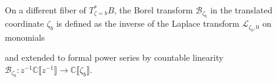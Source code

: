 \documentclass{article}
\newcommand{\maps}{\colon}
\newcommand{\C}{\mathbb{C}}
\newcommand{\laplace}{\mathcal{L}}
\newcommand{\borel}{\mathcal{B}}
\theoremstyle{definition}
\theoremstyle{plain}
\begin{document}
On a different fiber of $T_{\zeta=b}^*B$, the Borel transform $\borel_{\zeta_b}$ in the translated coordinate $\zeta_b$ is defined as the inverse of the Laplace transform $\laplace_{\zeta_b,0}$ on monomials
\begin{center}
\end{center}
and extended to formal power series by countable linearity $\borel_{\zeta_b} \maps z^{-1} \C \llbracket z^{-1} \rrbracket  \to \C \llbracket \zeta_b \rrbracket$.


\end{document}
